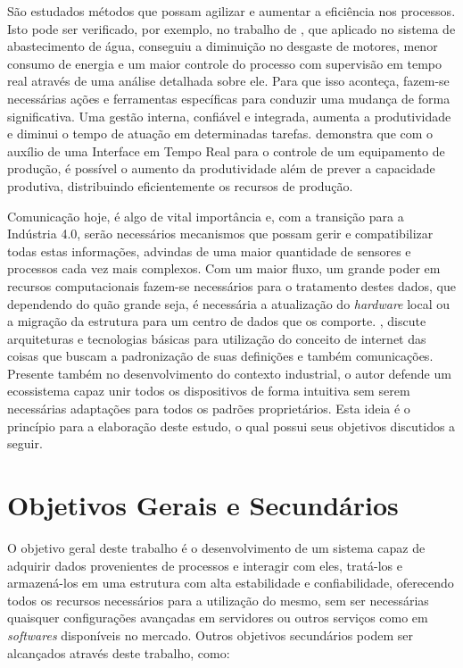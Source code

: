 São estudados métodos que possam agilizar e aumentar a eficiência nos processos. Isto pode ser verificado, por exemplo, no trabalho de , que aplicado no sistema de abastecimento de água, conseguiu a diminuição no desgaste de motores, menor consumo de energia e um maior controle do processo com supervisão em tempo real através de uma análise detalhada sobre ele. Para que isso aconteça, fazem-se necessárias ações e ferramentas específicas para conduzir uma mudança de forma significativa.
Uma gestão interna, confiável e integrada, aumenta a produtividade e diminui o tempo de atuação em  determinadas tarefas.   demonstra que com o auxílio de uma Interface em Tempo Real para o controle de um equipamento de produção, é possível o aumento da produtividade além de prever a capacidade produtiva, distribuindo eficientemente os recursos de produção.

Comunicação hoje, é algo de vital importância e, com a transição para a Indústria 4.0, serão necessários mecanismos que possam gerir e compatibilizar todas estas informações, advindas de uma maior quantidade de sensores e processos cada vez mais complexos. Com um maior fluxo, um grande poder em recursos computacionais fazem-se necessários para o tratamento destes dados, que dependendo do quão grande seja, é necessária a atualização do \textit{hardware} local ou a migração da estrutura para um centro de dados que os comporte. , discute arquiteturas e tecnologias básicas para utilização do conceito de internet das coisas que buscam a padronização de suas definições e também comunicações. Presente também no desenvolvimento do contexto industrial, o autor defende um ecossistema capaz unir todos os dispositivos de forma intuitiva sem serem necessárias adaptações para todos os padrões proprietários. Esta ideia é o princípio para a elaboração
deste estudo, o qual possui seus objetivos discutidos a seguir.

\section{Objetivos Gerais e Secundários}
\label{sec:objetivos}

O objetivo geral deste trabalho é o desenvolvimento de um sistema capaz de adquirir dados provenientes de processos e interagir com eles, tratá-los e armazená-los em uma estrutura com alta estabilidade e confiabilidade, oferecendo todos os recursos necessários para a utilização do mesmo, sem ser necessárias quaisquer configurações avançadas em servidores ou outros serviços como em  \textit{softwares} disponíveis no mercado.
\newpage
Outros objetivos secundários podem ser alcançados através deste trabalho, como:

